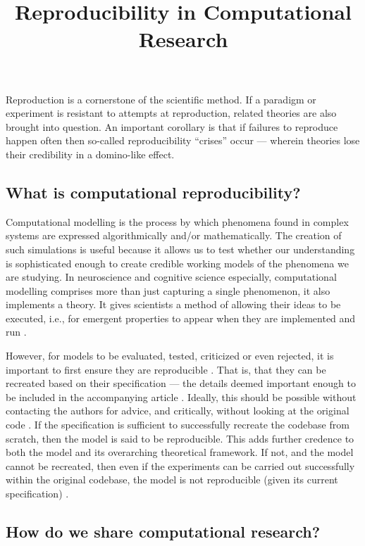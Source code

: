 \documentclass[jou]{apa6}
\title{Reproducibility in Computational Research}
\begin{document}
\maketitle

Reproduction is a cornerstone of the scientific method.
If a paradigm or experiment is resistant to attempts at reproduction, related theories are also brought into question.
An important corollary is that if failures to reproduce happen often then so-called reproducibility ``crises'' occur --- wherein theories lose their credibility in a domino-like effect.

\subsection*{What is computational reproducibility?}

Computational modelling is the process by which phenomena found in complex systems are expressed algorithmically and/or mathematically.
The creation of such simulations is useful because it allows us to test whether our understanding is sophisticated enough to create credible working models of the phenomena we are studying.
In neuroscience and cognitive science especially, computational modelling comprises more than just capturing a single phenomenon, it also  implements a theory.
It gives scientists a method of allowing their ideas to be executed, i.e., for emergent properties to appear when they are implemented and run \cite{mcclelland09}.

However, for models to be evaluated, tested, criticized or even rejected, it is important to first ensure they are reproducible \cite{topalidou15}.  
That is, that they can be recreated based on their specification --- the details deemed important enough to be included in the accompanying article \cite{hinsen15}.
Ideally, this should be possible without contacting the authors for advice, and critically, without looking at the original code \cite{cooper14}.
If the specification is sufficient to successfully recreate the codebase from scratch, then the model is said to be reproducible.
This adds further credence to both the model and its overarching theoretical framework.
If not, and the model cannot be recreated, then even if the experiments can be carried out successfully within the original codebase, the model is not reproducible (given its current specification) \cite{crook13}.


\subsection*{How do we share computational research?}
\end{document}
